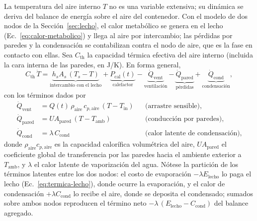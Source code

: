La temperatura del aire interno $T$ no es una variable extensiva; su din\'amica se deriva del balance de energ\'ia sobre el aire del contenedor. Con el modelo de dos nodos de la Secci\'on~\ref{sec:lecho}, el calor metab\'olico se genera en el lecho (Ec.~\eqref{eq:calor-metabolico}) y llega al aire por intercambio; las p\'erdidas por paredes y la condensaci\'on se contabilizan contra el nodo de aire, que es la fase en contacto con ellas. Sea $C_{\mathrm{th}}$ la capacidad t\'ermica efectiva del aire interno (incluida la cara interna de las paredes, en J/K). En forma general,
\begin{equation}
C_{\mathrm{th}}\,\dot T = \underbrace{h_s A_s\,(T_s - T)}_{\text{intercambio con el lecho}} + \underbrace{P_{\mathrm{cal}}(t)}_{\text{calefactor}} - \underbrace{\dot Q_{\mathrm{vent}}}_{\text{ventilaci\'on}} - \underbrace{\dot Q_{\mathrm{pared}}}_{\text{p\'erdidas}} + \underbrace{\dot Q_{\mathrm{cond}}}_{\text{condensaci\'on}},
\label{eq:energia-general}
\end{equation}
con los t\'erminos dados por
\begin{align}
\dot Q_{\mathrm{vent}} &= Q(t)\,\rho_{\mathrm{aire}}\,c_{p,\mathrm{aire}}\,(T - T_{\mathrm{in}}) && \text{(arrastre sensible)}, \label{eq:calor-vent}\\
\dot Q_{\mathrm{pared}} &= U A_{\mathrm{pared}}\,(T - T_{\mathrm{amb}}) && \text{(conducci\'on por paredes)}, \label{eq:calor-pared}\\
\dot Q_{\mathrm{cond}} &= \lambda\,C_{\mathrm{cond}} && \text{(calor latente de condensaci\'on)}, \label{eq:calor-cond}
\end{align}
donde $\rho_{\mathrm{aire}} c_{p,\mathrm{aire}}$ es la capacidad calor\'ifica volum\'etrica del aire, $U A_{\mathrm{pared}}$ el coeficiente global de transferencia por las paredes hacia el ambiente exterior a $T_{\mathrm{amb}}$, y $\lambda$ el calor latente de vaporizaci\'on del agua. N\'otese la partici\'on de los t\'erminos latentes entre los dos nodos: el costo de evaporaci\'on $-\lambda E_{\mathrm{lecho}}$ lo paga el lecho (Ec.~\eqref{eq:termica-lecho}), donde ocurre la evaporaci\'on, y el calor de condensaci\'on $+\lambda C_{\mathrm{cond}}$ lo recibe el aire, donde se deposita el condensado; sumados sobre ambos nodos reproducen el t\'ermino neto $-\lambda\,(E_{\mathrm{lecho}} - C_{\mathrm{cond}})$ del balance agregado.

